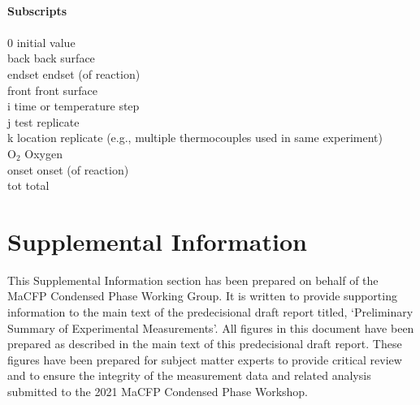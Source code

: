 \begin{tabbing}
\hspace{0.1in}            		\> \\
{\bf Subscripts}      	    	\> \\
\hspace{0.1in}            		\> \\
0     	                    			\> initial value \\
back         				\> back surface\\
endset         				\> endset (of reaction)\\
front         				\> front surface\\
i                          			\> time or temperature step\\
j                          			\> test replicate\\
k	                          		\> location replicate (e.g., multiple thermocouples used in same experiment)\\
O$_2$                         		\> Oxygen \\
onset                  			\> onset (of reaction)\\
tot                  				\> total\\
\end{tabbing}




\chapter{Supplemental Information}
\label{SI}
This Supplemental Information section has been prepared on behalf of the MaCFP Condensed Phase Working Group. It is written to provide supporting information to the main text of the predecisional draft report titled, `Preliminary Summary of Experimental Measurements'. All figures in this document have been prepared as described in the main text of this predecisional draft report. These figures have been prepared for subject matter experts to provide critical review and to ensure the integrity of the measurement data and related analysis submitted to the 2021 MaCFP Condensed Phase Workshop. 


